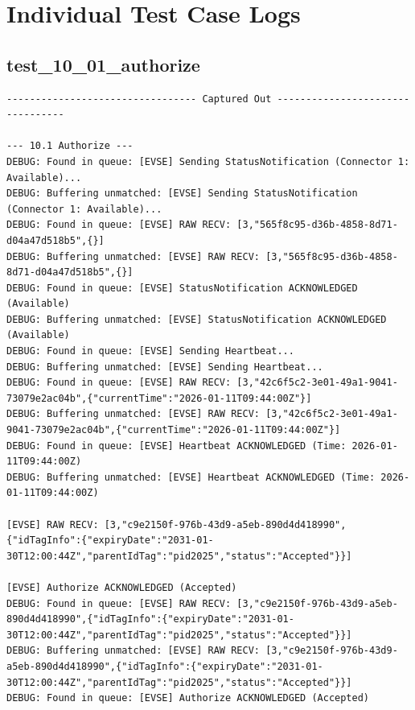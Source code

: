 \documentclass{article}
\begin{document}
\section{Individual Test Case Logs}\subsection*{test\_10\_01\_authorize}
\begin{lstlisting}
--------------------------------- Captured Out ---------------------------------

--- 10.1 Authorize ---
DEBUG: Found in queue: [EVSE] Sending StatusNotification (Connector 1: Available)...
DEBUG: Buffering unmatched: [EVSE] Sending StatusNotification (Connector 1: Available)...
DEBUG: Found in queue: [EVSE] RAW RECV: [3,"565f8c95-d36b-4858-8d71-d04a47d518b5",{}]
DEBUG: Buffering unmatched: [EVSE] RAW RECV: [3,"565f8c95-d36b-4858-8d71-d04a47d518b5",{}]
DEBUG: Found in queue: [EVSE] StatusNotification ACKNOWLEDGED (Available)
DEBUG: Buffering unmatched: [EVSE] StatusNotification ACKNOWLEDGED (Available)
DEBUG: Found in queue: [EVSE] Sending Heartbeat...
DEBUG: Buffering unmatched: [EVSE] Sending Heartbeat...
DEBUG: Found in queue: [EVSE] RAW RECV: [3,"42c6f5c2-3e01-49a1-9041-73079e2ac04b",{"currentTime":"2026-01-11T09:44:00Z"}]
DEBUG: Buffering unmatched: [EVSE] RAW RECV: [3,"42c6f5c2-3e01-49a1-9041-73079e2ac04b",{"currentTime":"2026-01-11T09:44:00Z"}]
DEBUG: Found in queue: [EVSE] Heartbeat ACKNOWLEDGED (Time: 2026-01-11T09:44:00Z)
DEBUG: Buffering unmatched: [EVSE] Heartbeat ACKNOWLEDGED (Time: 2026-01-11T09:44:00Z)

[EVSE] RAW RECV: [3,"c9e2150f-976b-43d9-a5eb-890d4d418990",{"idTagInfo":{"expiryDate":"2031-01-30T12:00:44Z","parentIdTag":"pid2025","status":"Accepted"}}]

[EVSE] Authorize ACKNOWLEDGED (Accepted)
DEBUG: Found in queue: [EVSE] RAW RECV: [3,"c9e2150f-976b-43d9-a5eb-890d4d418990",{"idTagInfo":{"expiryDate":"2031-01-30T12:00:44Z","parentIdTag":"pid2025","status":"Accepted"}}]
DEBUG: Buffering unmatched: [EVSE] RAW RECV: [3,"c9e2150f-976b-43d9-a5eb-890d4d418990",{"idTagInfo":{"expiryDate":"2031-01-30T12:00:44Z","parentIdTag":"pid2025","status":"Accepted"}}]
DEBUG: Found in queue: [EVSE] Authorize ACKNOWLEDGED (Accepted)
\end{lstlisting}
\end{document}
